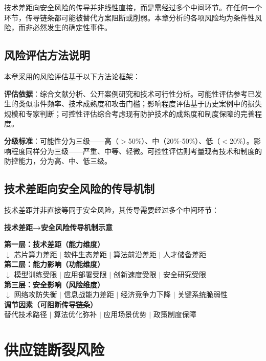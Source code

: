 技术差距向安全风险的传导并非线性直接，而是需经过多个中间环节。在任何一个环节，传导链条都可能被替代方案阻断或削弱。本章分析的各项风险均为条件性风险，而非必然发生的确定性事件。

\subsection{风险评估方法说明}

本章采用的风险评估基于以下方法论框架：

\textbf{评估依据}：综合文献分析、公开案例研究和技术可行性分析。可能性评估参考已发生的类似事件频率、技术成熟度和攻击门槛；影响程度评估基于历史案例中的损失规模和专家判断；可控性评估综合考虑现有防护技术的成熟度和制度保障的完善程度。

\textbf{分级标准}：可能性分为三级——高（$>$50\%）、中（20\%-50\%）、低（$<$20\%）。影响程度同样分为三级——严重、中等、轻微。可控性评估则考量现有技术和制度的防控能力，分为高、中、低三级。

\subsection{技术差距向安全风险的传导机制}

技术差距并非直接等同于安全风险，其传导需要经过多个中间环节：

\textbf{技术差距→安全风险传导机制示意}

\small
\textbf{第一层：技术差距（能力维度）}\\
$\downarrow$ \quad 芯片算力差距 $|$ 软件生态差距 $|$ 算法前沿差距 $|$ 人才储备差距\\[0.5em]

\textbf{第二层：能力影响（功能维度）}\\
$\downarrow$ \quad 模型训练受限 $|$ 应用部署受限 $|$ 创新速度受限 $|$ 安全研究受限\\[0.5em]

\textbf{第三层：安全影响（风险维度）}\\
$\downarrow$ \quad 网络攻防失衡 $|$ 信息战能力差距 $|$ 经济竞争力下降 $|$ 关键系统脆弱性\\[0.5em]

\textbf{调节因素（可阻断传导链条）}\\
\quad\quad 替代技术路径 $|$ 算法优化弥补 $|$ 应用场景优势 $|$ 政策制度保障

\section{供应链断裂风险}


